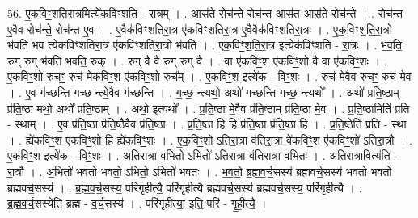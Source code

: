\documentclass[17pt]{extarticle}
\begin{document}
56. ए॒क॒विꣳ॒॒श॒ति॒रा॒त्रमित्ये॑कविꣳशति - रा॒त्रम् । . आस॑ते॒ रोच॑न्ते॒ रोच॑न्त॒ आस॑त॒ आस॑ते॒ रोच॑न्ते । . रोच॑न्त ए॒वैव रोच॑न्ते॒ रोच॑न्त ए॒व । . ए॒वैक॑विꣳशतिरा॒त्र ए॑कविꣳशतिरा॒त्र ए॒वैवैक॑विꣳशतिरा॒त्रः । . ए॒क॒विꣳ॒॒श॒ति॒रा॒त्रो भ॑वति भव त्येकविꣳशतिरा॒त्र ए॑कविꣳशतिरा॒त्रो भ॑वति । . ए॒क॒विꣳ॒॒श॒ति॒रा॒त्र इत्येक॑विꣳशति - रा॒त्रः । . भ॒व॒ति॒ रुग् रुग् भ॑वति भवति॒ रुक् । . रुग् वै वै रुग् रुग् वै । . वा ए॑कविꣳ॒॒श ए॑कविꣳ॒॒शो वै वा ए॑कविꣳ॒॒शः । . ए॒क॒विꣳ॒॒शो रुचꣳ॒॒ रुच॑ मेकविꣳ॒॒श ए॑कविꣳ॒॒शो रुच᳚म् । . ए॒क॒विꣳ॒॒श इत्ये॑क - विꣳ॒॒शः । . रुच॑ मे॒वैव रुचꣳ॒॒ रुच॑ मे॒व । . ए॒व ग॑च्छन्ति गच्छ न्त्ये॒वैव ग॑च्छन्ति । . ग॒च्छ॒ न्त्यथो॒ अथो॑ गच्छन्ति गच्छ॒ न्त्यथो᳚ । . अथो᳚ प्रति॒ष्ठाम् प्र॑ति॒ष्ठा मथो॒ अथो᳚ प्रति॒ष्ठाम् । . अथो॒ इत्यथो᳚ । . प्र॒ति॒ष्ठा मे॒वैव प्र॑ति॒ष्ठाम् प्र॑ति॒ष्ठा मे॒व । . प्र॒ति॒ष्ठामिति॑ प्रति - स्थाम् । . ए॒व प्र॑ति॒ष्ठा प्र॑ति॒ष्ठैवैव प्र॑ति॒ष्ठा । . प्र॒ति॒ष्ठा हि हि प्र॑ति॒ष्ठा प्र॑ति॒ष्ठा हि । . प्र॒ति॒ष्ठेति॑ प्रति - स्था । . ह्ये॑कविꣳ॒॒श ए॑कविꣳ॒॒शो हि ह्ये॑कविꣳ॒॒शः । . ए॒क॒विꣳ॒॒शो॑ ऽतिरा॒त्रा व॑तिरा॒त्रा वे॑कविꣳ॒॒श ए॑कविꣳ॒॒शो॑ ऽतिरा॒त्रौ । . ए॒क॒विꣳ॒॒श इत्ये॑क - विꣳ॒॒शः । . अ॒ति॒रा॒त्रा व॒भितो॒ ऽभितो॑ ऽतिरा॒त्रा व॑तिरा॒त्रा व॒भितः॑ । . अ॒ति॒रा॒त्रावित्य॑ति - रा॒त्रौ । . अ॒भितो॑ भवतो भवतो॒ ऽभितो॒ ऽभितो॑ भवतः । . भ॒व॒तो॒ ब्र॒ह्म॒व॒र्च॒सस्य॑ ब्रह्मवर्च॒सस्य॑ भवतो भवतो ब्रह्मवर्च॒सस्य॑ । . ब्र॒ह्म॒व॒र्च॒सस्य॒ परि॑गृहीत्यै॒ परि॑गृहीत्यै ब्रह्मवर्च॒सस्य॑ ब्रह्मवर्च॒सस्य॒ परि॑गृहीत्यै । . ब्र॒ह्म॒व॒र्च॒सस्येति॑ ब्रह्म - व॒र्च॒सस्य॑ । . परि॑गृहीत्या॒ इति॒ परि॑ - गृ॒ही॒त्यै॒ । \newline
\end{document}
